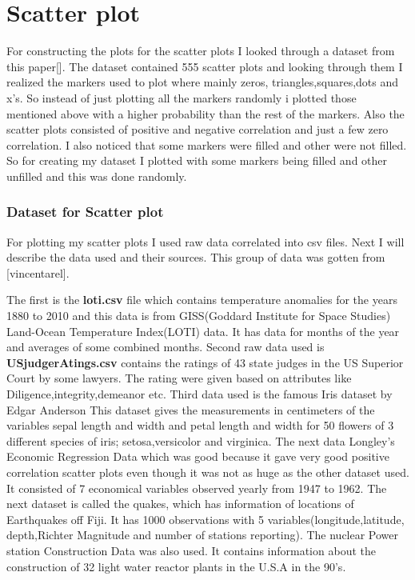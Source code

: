 \documentclass[12pt, a4paper,oneside]{report}
\begin{document}
\chapter{Scatter plot}
For constructing the plots for the scatter plots I looked through a dataset from this paper[]. The dataset contained 555
scatter plots and looking through them I realized the markers used to plot where mainly zeros, triangles,squares,dots and x's.
So instead of just plotting all the markers randomly i plotted those mentioned above with a higher probability than the rest of the markers.
Also the scatter plots consisted of positive and negative correlation and just a few zero correlation. 
I also noticed that some markers were filled and other were not filled. So for creating my dataset I plotted with some markers being filled and other unfilled and this was done randomly. 

\subsection{Dataset for Scatter plot}
For plotting my scatter plots I used raw data correlated into csv files. Next I will describe the data used and their sources.
This group of data was gotten from [vincentarel].

The first is the \textbf{loti.csv} file which contains temperature anomalies for the years 1880 to 2010 and this data is from GISS(Goddard Institute for Space Studies) Land-Ocean
Temperature Index(LOTI) data. It has data for months of the year and averages of some combined months.
Second raw data used is \textbf{USjudgerAtings.csv} contains the ratings of 43 state judges in the US Superior Court by some lawyers. The rating were given based on attributes like Diligence,integrity,demeanor etc.
Third data used is the famous Iris dataset by Edgar Anderson
This dataset gives the measurements in centimeters of the variables sepal length and width and petal length and width for 50 flowers of 3 different species of iris; setosa,versicolor and virginica. 
The next data Longley's Economic Regression Data which was good because it gave very good positive correlation scatter plots even though it was not as huge as the other dataset used. It
consisted of 7 economical variables observed yearly from 1947 to 1962.
The next dataset is called the quakes, which has information of locations of Earthquakes off Fiji. It has 1000 observations with 5 variables(longitude,latitude, depth,Richter Magnitude and number of stations reporting).
The nuclear Power station Construction Data was also used. It contains information about the construction of 32 light water reactor plants in the U.S.A  in the 90's.
\end{document}
